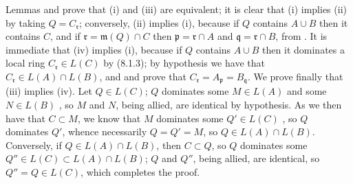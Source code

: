 \documentclass[../main.tex]{subfiles}
\begin{document}
Lemmas  and  prove that (i) and (iii) are equivalent; it
is clear that (i) implies (ii) by taking $Q=C_\mathfrak{r}$; conversely, (ii)
implies (i), because if $Q$ contains $A\cup B$ then it contains $C$, and if
$\mathfrak{r}=\mathfrak{m}(Q)\cap C$ then $\mathfrak{p}=\mathfrak{r}\cap A$ and
$\mathfrak{q}=\mathfrak{r}\cap B$, from . It is immediate that (iv)
implies (i), because if $Q$ contains $A\cup B$ then it dominates a local ring
$C_\mathfrak{r}\in L(C)$ by (8.1.3); by hypothesis we have that
$C_\mathfrak{r}\in L(A)\cap L(B)$, and  and  prove that
$C_\mathfrak{r}=A_\mathfrak{p}=B_\mathfrak{q}$. We prove finally that (iii)
implies (iv). Let $Q\in L(C)$; $Q$ dominates some $M\in L(A)$ and some $N\in
L(B)$ , so $M$ and $N$, being allied, are identical by hypothesis.
As we then have that $C\subset M$, we know that $M$ dominates some $Q'\in L(C)$
, so $Q$ dominates $Q'$, whence necessarily  $Q=Q'=M$,
so $Q\in L(A)\cap L(B)$. Conversely, if $Q\in L(A)\cap L(B)$, then $C\subset
Q$, so  $Q$ dominates some $Q''\in L(C)\subset L(A)\cap L(B)$; $Q$
and $Q''$, being allied, are identical, so $Q''=Q\in L(C)$, which completes the
proof.
\end{document}
